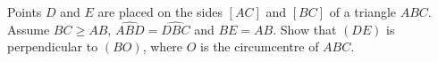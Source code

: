 Points $D$ and $E$ are placed on the sides $[AC]$ and $[BC]$ of a triangle $ABC$. Assume $BC \geq AB$, $\widehat{ABD} = \widehat{DBC}$ and $BE = AB$. Show that $(DE)$ is perpendicular to $(BO)$, where $O$ is the circumcentre of $ABC$.
